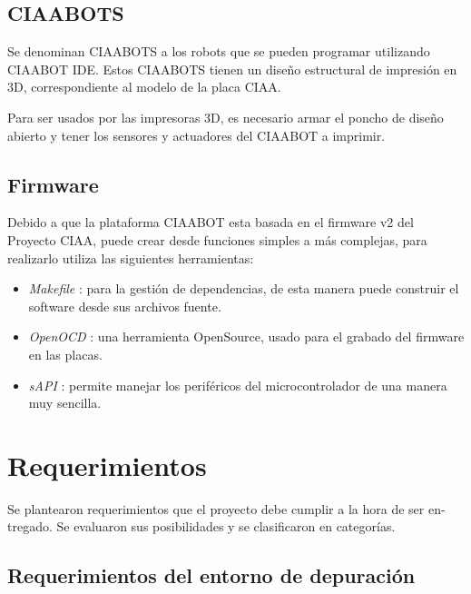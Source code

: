 \subsection{CIAABOTS}
\label{subsec:CIAABOTS}

Se denominan CIAABOTS a los robots que se pueden programar utilizando CIAABOT IDE. Estos CIAABOTS tienen un diseño estructural de impresión en 3D, correspondiente al modelo de la placa CIAA. 

Para ser usados por las impresoras 3D, es necesario armar el poncho de diseño abierto y tener los sensores y actuadores del CIAABOT a imprimir.

\subsection{Firmware}
\label{subsec:Firmware}

Debido a que la plataforma CIAABOT esta basada en el firmware v2 \citep{CIAA:firmwarev2} del Proyecto CIAA, puede crear desde funciones simples a más complejas, para realizarlo
utiliza las siguientes herramientas:

\begin{itemize}
	\item \emph{Makefile} \citep{makefile}: para la gestión de dependencias, de esta manera puede construir
	el software desde sus archivos fuente.	
	\item \emph{OpenOCD} \citep{openocd}: una herramienta OpenSource, usado para el grabado del firmware
	en las placas.
	\item \emph{sAPI} \citep{sAPI}: permite manejar los periféricos del microcontrolador de una manera
	muy sencilla.
\end{itemize}


\section{Requerimientos}
\label{sec:ejemplo}

Se plantearon requerimientos que el proyecto debe cumplir a la hora de ser en-
tregado. Se evaluaron sus posibilidades y se clasificaron en categorías.

\subsection{Requerimientos del entorno de depuración}

